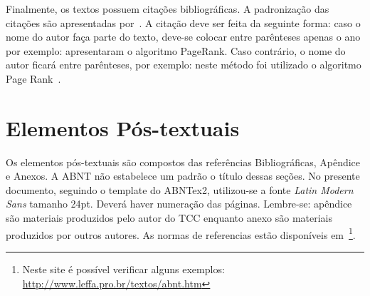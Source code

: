 Finalmente, os textos possuem citações bibliográficas. A padronização das citações são apresentadas por~. A citação deve ser feita da seguinte forma: caso o nome do autor faça parte do texto, deve-se colocar entre parênteses apenas o ano por exemplo:  apresentaram o algoritmo PageRank. Caso contrário, o nome do autor ficará entre parênteses, por exemplo: neste método foi utilizado o algoritmo Page Rank~\cite{brin1998anatomy,abntCitacoes2002}.


\section{Elementos Pós-textuais}
\label{sec:posTextual}

Os elementos pós-textuais são compostos das referências Bibliográficas, Apêndice e Anexos. A ABNT não estabelece um padrão o título dessas seções. No presente documento, seguindo o template do ABNTex2, utilizou-se a fonte \textit{Latin Modern Sans} tamanho 24pt. Deverá haver numeração das páginas. Lembre-se: apêndice são materiais produzidos pelo autor do TCC enquanto anexo são materiais produzidos por outros autores. 
As normas de referencias estão disponíveis em~\cite{abntCitacoes2002}\footnote{Neste site é possível verificar alguns exemplos: \url{http://www.leffa.pro.br/textos/abnt.htm}}.